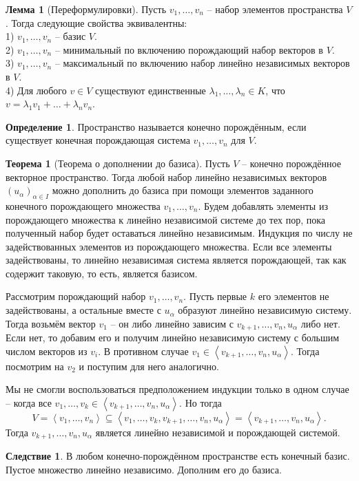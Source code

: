 \documentclass[10pt,a4paper,oneside]{book}
\theoremstyle{definition}
\newtheorem{defn}{Определение}
\newtheorem{thm}{Теорема}
\newtheorem{lem}{Лемма}
\newtheorem{cor}{Следствие}
\def\lan{\left\langle }
\def\ran{\right\rangle}
\def\thrm{\begin{thm}}
\def\ethrm{\end{thm}}
\def\dfn{\begin{defn}}
\def\edfn{\end{defn}}
\def\lm{\begin{lem}}
\def\elm{\end{lem}}
\def\crl{\begin{cor}}
\def\ecrl{\end{cor}}
\begin{document}
\lm[Переформулировки] Пусть $v_1,\dots,v_n$ -- набор элементов пространства $V$.
Тогда следующие свойства эквивалентны: \\
1) $v_1,\dots,v_n$ -- базис $V$.\\
2) $v_1,\dots,v_n$ -- минимальный по включению порождающий набор векторов в $V$.\\
3) $v_1,\dots,v_n$ -- максимальный по включению набор линейно независимых векторов в $V$.\\
4) Для любого $v\in V$ существуют единственные $\lambda_1,\dots,\lambda_n \in K$, что $v=\lambda_1v_1+\dots+\lambda_nv_n$.
\proof 
\endproof
\elm

\dfn Пространство называется конечно порождённым, если существует конечная порождающая система $v_1,\dots,v_n$ для $V$.
\edfn

\thrm[Теорема о дополнении до базиса] Пусть $V$ -- конечно порождённое векторное пространство. Тогда любой набор линейно независимых векторов $(u_{\alpha})_{\alpha \in I}$ можно дополнить до базиса при помощи элементов заданного конечного порождающего множества $v_1,\dots,v_n$.
\proof Будем добавлять элементы из порождающего множества к линейно независимой системе до тех пор, пока полученный набор будет оставаться линейно независимым.
Индукция по числу не задействованных элементов из порождающего множества. Если все элементы задействованы, то линейно независимая система является порождающей, так как содержит таковую, то есть, является базисом. 

Рассмотрим порождающий набор $v_1,\dots,v_n$. Пусть первые $k$ его элементов не задействованы, а остальные вместе с $u_{\alpha}$ образуют линейно независимую систему. Тогда возьмём вектор $v_1$ -- он либо линейно зависим с $v_{k+1},\dots,v_n, u_{\alpha}$ либо нет. Если нет, то добавим его и получим линейно независимую систему с большим числом векторов из $v_i$. В противном случае $v_1 \in \lan v_{k+1},\dots,v_n, u_{\alpha} \ran$. Тогда посмотрим на $v_2$ и поступим для него аналогично. 

Мы не смогли воспользоваться предположением индукции только в одном случае -- когда все $v_1,\dots,v_k\in \lan v_{k+1},\dots,v_n, u_{\alpha} \ran$. Но тогда
$$V=\lan v_1,\dots,v_n \ran \subseteq
\lan v_1,\dots,v_k, v_{k+1},\dots,v_n, u_{\alpha} \ran=\lan v_{k+1},\dots,v_n, u_{\alpha} \ran.$$
Тогда $v_{k+1},\dots,v_n, u_{\alpha}$ является линейно независимой и порождающей системой.
\endproof
\ethrm

\crl В любом конечно-порождённом пространстве есть конечный базис.
\proof Пустое множество линейно независимо. Дополним его до базиса.
\endproof
\ecrl
\end{document}
